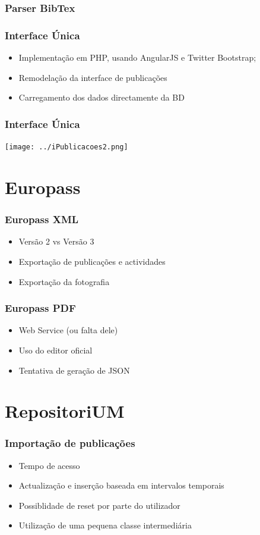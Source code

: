 \documentclass{beamer}
\begin{document}
\begin{frame}
	\frametitle{Parser BibTex}
\end{frame}

\begin{frame}
	\frametitle{Interface Única}
	\begin{itemize}
		\item Implementação em PHP, usando AngularJS e Twitter Bootstrap;
		\item Remodelação da interface de publicações
		\item Carregamento dos dados directamente da BD
	\end{itemize}
\end{frame}
\begin{frame}
	\frametitle{Interface Única}
	\texttt{[image: ../iPublicacoes2.png]}
\end{frame}

\section{Europass}
\begin{frame}
	\frametitle{Europass XML}
	\begin{itemize}
		\item Versão 2 vs Versão 3
		\item Exportação de publicações e actividades
		\item Exportação da fotografia
	\end{itemize}
\end{frame}
\begin{frame}
	\frametitle{Europass PDF}
	\begin{itemize}
		\item Web Service (ou falta dele)
		\item Uso do editor oficial
		\item Tentativa de geração de JSON
	\end{itemize}
\end{frame}

\section{RepositoriUM}
\begin{frame}
	\frametitle{Importação de publicações}
	\begin{itemize}
		\item Tempo de acesso
		\item Actualização e inserção baseada em intervalos temporais
		\item Possiblidade de reset por parte do utilizador
		\item Utilização de uma pequena classe intermediária
		
	\end{itemize}
\end{frame}
\end{document}
